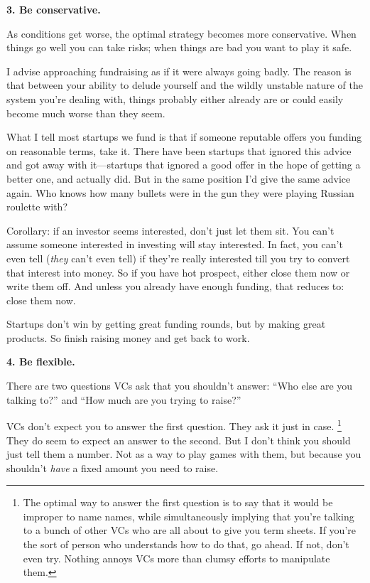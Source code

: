 \documentclass[12pt]{book}
\begin{document}
\textbf{3. Be conservative.}

As conditions get worse, the optimal strategy becomes more conservative.
When things go well you can take risks; when things are bad you want to
play it safe.

I advise approaching fundraising as if it were always going badly. The
reason is that between your ability to delude yourself and the wildly
unstable nature of the system you're dealing with, things probably
either already are or could easily become much worse than they seem.

What I tell most startups we fund is that if someone reputable offers
you funding on reasonable terms, take it. There have been startups that
ignored this advice and got away with it---startups that ignored a good
offer in the hope of getting a better one, and actually did. But in the
same position I'd give the same advice again. Who knows how many bullets
were in the gun they were playing Russian roulette with?

Corollary: if an investor seems interested, don't just let them sit. You
can't assume someone interested in investing will stay interested. In
fact, you can't even tell (\emph{they} can't even tell) if they're
really interested till you try to convert that interest into money. So
if you have hot prospect, either close them now or write them off. And
unless you already have enough funding, that reduces to: close them now.

Startups don't win by getting great funding rounds, but by making great
products. So finish raising money and get back to work.

\textbf{4. Be flexible.}

There are two questions VCs ask that you shouldn't answer: ``Who else
are you talking to?'' and ``How much are you trying to raise?''

VCs don't expect you to answer the first question. They ask it just in
case. \footnote{The optimal way to answer the first question is to say that it
would be improper to name names, while simultaneously implying that
you're talking to a bunch of other VCs who are all about to give you
term sheets. If you're the sort of person who understands how to do
that, go ahead. If not, don't even try. Nothing annoys VCs more than
clumsy efforts to manipulate them.} They do seem to expect an answer to the
second. But I don't think you should just tell them a number. Not as a
way to play games with them, but because you shouldn't \emph{have} a
fixed amount you need to raise.
\end{document}
